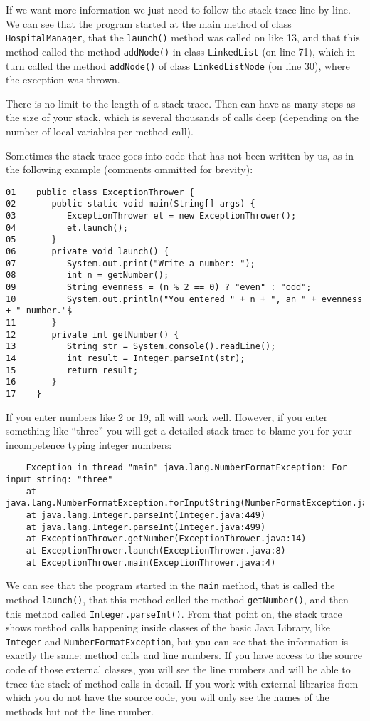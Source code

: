 If we want more information we just need to follow the stack trace
line by line. We can see that the program started at the main method
of class \verb+HospitalManager+, that the \verb+launch()+ method was
called on like 13, and that this method called the method
\verb+addNode()+ in class \verb+LinkedList+ (on line 71), which in
turn called the method \verb+addNode()+ of class \verb+LinkedListNode+
(on line 30), where the exception was thrown. 

There is no limit to the length of a stack trace. Then can have as
many steps as the size of your stack, which is several thousands of
calls deep (depending on the number of local variables per method
call). 

Sometimes the stack trace goes into code that has not been written by
us, as in the following example (comments ommitted for brevity): 

\begin{verbatim}
01    public class ExceptionThrower {
02       public static void main(String[] args) {
03          ExceptionThrower et = new ExceptionThrower();
04          et.launch();
05       }
06       private void launch() {
07          System.out.print("Write a number: ");
08          int n = getNumber();
09          String evenness = (n % 2 == 0) ? "even" : "odd";
10          System.out.println("You entered " + n + ", an " + evenness + " number."$
11       }
12       private int getNumber() {
13          String str = System.console().readLine();
14          int result = Integer.parseInt(str);
15          return result;
16       }
17    }
\end{verbatim}

If you enter numbers like 2 or 19, all will work well. However, if you
enter something like ``three'' you will get a detailed stack trace to
blame you for your incompetence typing integer numbers: 

\begin{verbatim}
    Exception in thread "main" java.lang.NumberFormatException: For input string: "three"
	at java.lang.NumberFormatException.forInputString(NumberFormatException.java:48)
	at java.lang.Integer.parseInt(Integer.java:449)
	at java.lang.Integer.parseInt(Integer.java:499)
	at ExceptionThrower.getNumber(ExceptionThrower.java:14)
	at ExceptionThrower.launch(ExceptionThrower.java:8)
	at ExceptionThrower.main(ExceptionThrower.java:4)
\end{verbatim}

We can see that the program started in the \verb+main+ method, that is called
the method \verb+launch()+, that this method called the method
\verb+getNumber()+, and then this method called
\verb+Integer.parseInt()+. From that point on, the stack trace shows
method calls happening inside classes of the basic Java Library, like
\verb+Integer+ and \verb+NumberFormatException+, but you can see that
the information is exactly the same: method calls and line numbers. If
you have access to the source code of those external classes, you will
see the line numbers and will be able to trace the stack of method
calls in detail. If you work with external libraries from which you do
not have the source code, you will only see the names of the methods
but not the line number. 

